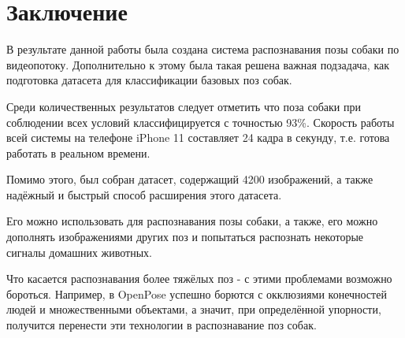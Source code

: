 \chapter*{Заключение}						%


В результате данной работы была создана система распознавания позы собаки по видеопотоку. Дополнительно к этому была такая решена важная подзадача, как подготовка датасета для классификации базовых поз собак.

Среди количественных результатов следует отметить что поза собаки при соблюдении всех условий классифицируется с точностью 93\%. Скорость работы всей системы на телефоне iPhone 11 составляет 24 кадра в секунду, т.е. готова работать в реальном времени.

Помимо этого, был собран датасет, содержащий 4200 изображений, а также надёжный и быстрый способ расширения этого датасета.

Его можно использовать для распознавания позы собаки, а также, его можно дополнять изображениями других поз и попытаться распознать некоторые сигналы домашних животных.

Что касается распознавания более тяжёлых поз - с этими проблемами возможно бороться. Например, в OpenPose\cite{openpose} успешно борются с окклюзиями конечностей людей и множественными объектами, а значит, при определённой упорности, получится перенести эти технологии в распознавание поз собак.